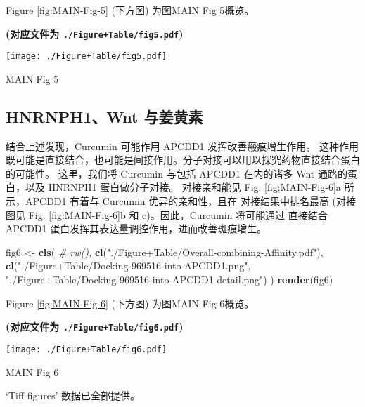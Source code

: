 \documentclass[
]{article}
\newenvironment{Shaded}{\begin{snugshade}}{\end{snugshade}}
\newcommand{\CommentTok}[1]{\textcolor[rgb]{0.56,0.35,0.01}{\textit{#1}}}
\newcommand{\KeywordTok}[1]{\textcolor[rgb]{0.13,0.29,0.53}{\textbf{#1}}}
\newcommand{\NormalTok}[1]{#1}
\newcommand{\StringTok}[1]{\textcolor[rgb]{0.31,0.60,0.02}{#1}}
\begin{document}
Figure \ref{fig:MAIN-Fig-5} (下方图) 为图MAIN Fig 5概览。

\textbf{(对应文件为 \texttt{./Figure+Table/fig5.pdf})}

\def\@captype{figure}
\begin{center}
\texttt{[image: ./Figure+Table/fig5.pdf]}
\caption{MAIN Fig 5}\label{fig:MAIN-Fig-5}
\end{center}

\hypertarget{hnrnph1wnt-ux4e0eux59dcux9ec4ux7d20}{%
\subsection{HNRNPH1、Wnt 与姜黄素}\label{hnrnph1wnt-ux4e0eux59dcux9ec4ux7d20}}

结合上述发现，Curcumin 可能作用 APCDD1 发挥改善瘢痕增生作用。
这种作用既可能是直接结合，也可能是间接作用。分子对接可以用以探究药物直接结合蛋白的可能性。
这里，我们将 Curcumin 与包括 APCDD1 在内的诸多 Wnt 通路的蛋白，以及 HNRNPH1 蛋白做分子对接。
对接亲和能见 Fig. \ref{fig:MAIN-Fig-6}a 所示，APCDD1 有着与 Curcumin 优异的亲和性，且在
对接结果中排名最高 (对接图见 Fig. \ref{fig:MAIN-Fig-6}b 和 c)。因此，Curcumin 将可能通过
直接结合 APCDD1 蛋白发挥其表达量调控作用，进而改善斑痕增生。

\begin{Shaded}
\begin{Highlighting}[]
\NormalTok{fig6 \textless{}{-}}\StringTok{ }\KeywordTok{cls}\NormalTok{(}
  \CommentTok{\# rw(),}
  \KeywordTok{cl}\NormalTok{(}\StringTok{"./Figure+Table/Overall{-}combining{-}Affinity.pdf"}\NormalTok{),}
  \KeywordTok{cl}\NormalTok{(}\StringTok{"./Figure+Table/Docking{-}969516{-}into{-}APCDD1.png"}\NormalTok{,}
    \StringTok{"./Figure+Table/Docking{-}969516{-}into{-}APCDD1{-}detail.png"}\NormalTok{)}
\NormalTok{)}
\KeywordTok{render}\NormalTok{(fig6)}
\end{Highlighting}
\end{Shaded}

Figure \ref{fig:MAIN-Fig-6} (下方图) 为图MAIN Fig 6概览。

\textbf{(对应文件为 \texttt{./Figure+Table/fig6.pdf})}

\def\@captype{figure}
\begin{center}
\texttt{[image: ./Figure+Table/fig6.pdf]}
\caption{MAIN Fig 6}\label{fig:MAIN-Fig-6}
\end{center}

`Tiff figures' 数据已全部提供。
\end{document}
